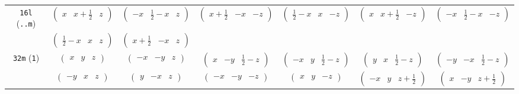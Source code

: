 \documentclass[fleqn,9pt,landscape]{jsarticle}
\begin{document}
\begin{center}
\begin{longtable}{ccccccc}
{\tt 16l} ({\tt ..m}) & $ \begin{pmatrix} x & x + \frac{1}{2} & z \end{pmatrix} $ & $ \begin{pmatrix} - x & \frac{1}{2} - x & z \end{pmatrix} $ & $ \begin{pmatrix} x + \frac{1}{2} & - x & - z \end{pmatrix} $ & $ \begin{pmatrix} \frac{1}{2} - x & x & - z \end{pmatrix} $ & $ \begin{pmatrix} x & x + \frac{1}{2} & - z \end{pmatrix} $ & $ \begin{pmatrix} - x & \frac{1}{2} - x & - z \end{pmatrix} $ \\
& $ \begin{pmatrix} \frac{1}{2} - x & x & z \end{pmatrix} $ & $ \begin{pmatrix} x + \frac{1}{2} & - x & z \end{pmatrix} $ & $  $ & $  $ & $  $ & $  $ \\ \hline
{\tt 32m} ({\tt 1}) & $ \begin{pmatrix} x & y & z \end{pmatrix} $ & $ \begin{pmatrix} - x & - y & z \end{pmatrix} $ & $ \begin{pmatrix} x & - y & \frac{1}{2} - z \end{pmatrix} $ & $ \begin{pmatrix} - x & y & \frac{1}{2} - z \end{pmatrix} $ & $ \begin{pmatrix} y & x & \frac{1}{2} - z \end{pmatrix} $ & $ \begin{pmatrix} - y & - x & \frac{1}{2} - z \end{pmatrix} $ \\
& $ \begin{pmatrix} - y & x & z \end{pmatrix} $ & $ \begin{pmatrix} y & - x & z \end{pmatrix} $ & $ \begin{pmatrix} - x & - y & - z \end{pmatrix} $ & $ \begin{pmatrix} x & y & - z \end{pmatrix} $ & $ \begin{pmatrix} - x & y & z + \frac{1}{2} \end{pmatrix} $ & $ \begin{pmatrix} x & - y & z + \frac{1}{2} \end{pmatrix} $ \\

\end{longtable}
\end{center}
\end{document}
